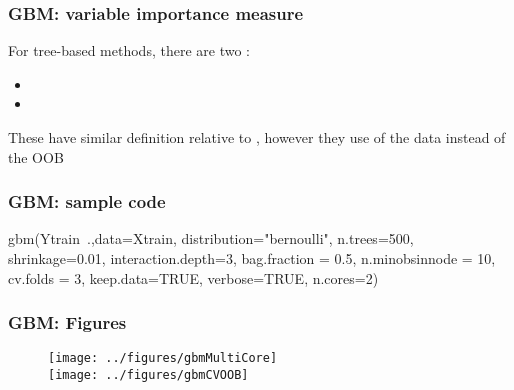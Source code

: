 \documentclass[12pt]{beamer}
\begin{document}
\begin{frame}[fragile]
\frametitle{GBM: variable importance measure}
For tree-based methods, there are two :

\begin{itemize}
\item {}
\item {}

\end{itemize}

\vsp

These have similar definition relative to , however they use  of the data instead of the OOB

\end{frame}

\begin{frame}[fragile]
\frametitle{GBM: sample code}
\begin{blockcode}
gbm(Ytrain~.,data=Xtrain, 
    distribution="bernoulli", 
    n.trees=500,        
    shrinkage=0.01,
    interaction.depth=3,     
    bag.fraction = 0.5,         
    n.minobsinnode = 10,  
    cv.folds = 3,               
    keep.data=TRUE,    
    verbose=TRUE,             
    n.cores=2)                   
    \end{blockcode}
\end{frame}

\begin{frame}[fragile]
\frametitle{GBM: Figures}
\begin{figure}
\centering
\texttt{[image: ../figures/gbmMultiCore]} \\
\texttt{[image: ../figures/gbmCVOOB]}
\end{figure}
\end{frame}
\end{document}
